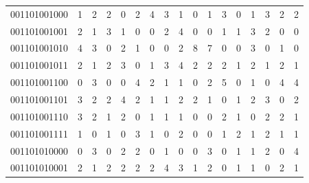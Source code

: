 \documentclass[10pt,a4paper]{article}
\begin{document}
\begin{longtable}{ |c|c|c|c|c|c|c|c|c|c|c|c|c|c|c|c|c| }
    001101001000              & 1                            & 2                                & 2                            & 0                              & 2   & 4   & 3   & 1   & 0   & 1   & 3   & 0   & 1   & 3   & 2   & 2   \\
    001101001001              & 2                            & 1                                & 3                            & 1                              & 0   & 0   & 2   & 4   & 0   & 0   & 1   & 1   & 3   & 2   & 0   & 0   \\
    001101001010              & 4                            & 3                                & 0                            & 2                              & 1   & 0   & 0   & 2   & 8   & 7   & 0   & 0   & 3   & 0   & 1   & 0   \\
    001101001011              & 2                            & 1                                & 2                            & 3                              & 0   & 1   & 3   & 4   & 2   & 2   & 2   & 1   & 2   & 1   & 2   & 1   \\
    001101001100              & 0                            & 3                                & 0                            & 0                              & 4   & 2   & 1   & 1   & 0   & 2   & 5   & 0   & 1   & 0   & 4   & 4   \\
    001101001101              & 3                            & 2                                & 2                            & 4                              & 2   & 1   & 1   & 2   & 2   & 1   & 0   & 1   & 2   & 3   & 0   & 2   \\
    001101001110              & 3                            & 2                                & 1                            & 2                              & 0   & 1   & 1   & 1   & 0   & 0   & 2   & 1   & 0   & 2   & 2   & 1   \\
    001101001111              & 1                            & 0                                & 1                            & 0                              & 3   & 1   & 0   & 2   & 0   & 0   & 1   & 2   & 1   & 2   & 1   & 1   \\
    001101010000              & 0                            & 3                                & 0                            & 2                              & 2   & 0   & 1   & 0   & 0   & 3   & 0   & 1   & 1   & 2   & 0   & 4   \\
    001101010001              & 2                            & 1                                & 2                            & 2                              & 2   & 2   & 4   & 3   & 1   & 2   & 0   & 1   & 1   & 0   & 2   & 1   \\

\end{longtable}
\end{document}
